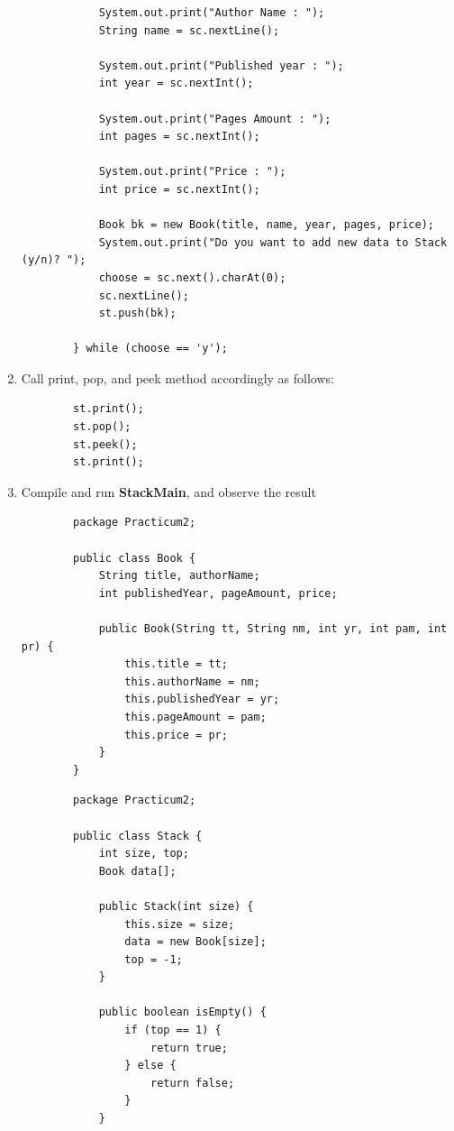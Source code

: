 \documentclass[12pt,titlepage]{article}
\begin{document}
\begin{enumerate}
\begin{verbatim}
            System.out.print("Author Name : ");
            String name = sc.nextLine();

            System.out.print("Published year : ");
            int year = sc.nextInt();

            System.out.print("Pages Amount : ");
            int pages = sc.nextInt();

            System.out.print("Price : ");
            int price = sc.nextInt();

            Book bk = new Book(title, name, year, pages, price);
            System.out.print("Do you want to add new data to Stack (y/n)? ");
            choose = sc.next().charAt(0);
            sc.nextLine();
            st.push(bk);

        } while (choose == 'y');
    \end{verbatim}
    \item Call print, pop, and peek method accordingly as follows:
    \begin{verbatim}
        st.print();
        st.pop();
        st.peek();
        st.print();
    \end{verbatim}
    \item Compile and run \textbf{StackMain}, and observe the result
    \begin{verbatim}
        package Practicum2;

        public class Book {
            String title, authorName;
            int publishedYear, pageAmount, price;

            public Book(String tt, String nm, int yr, int pam, int pr) {
                this.title = tt;
                this.authorName = nm;
                this.publishedYear = yr;
                this.pageAmount = pam;
                this.price = pr;
            }
        }
    \end{verbatim}
    \begin{verbatim}
        package Practicum2;

        public class Stack {
            int size, top;
            Book data[];

            public Stack(int size) {
                this.size = size;
                data = new Book[size];
                top = -1;
            }

            public boolean isEmpty() {
                if (top == 1) {
                    return true;
                } else {
                    return false;
                }
            }


\end{verbatim}
\end{enumerate}
\end{document}
